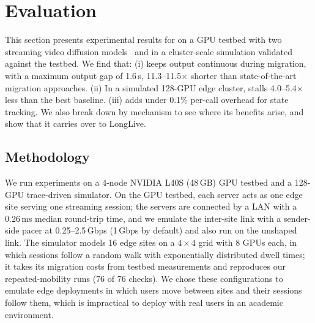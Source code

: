 
\section{Evaluation}
\label{sec:eval}

This section presents experimental results for \sys on a GPU testbed with two streaming video diffusion
models~\cite{sdv2,longlive} and in a cluster-scale simulation validated against the testbed.
We find that:
(i) \sys keeps output continuous during migration, with a maximum output gap of 1.6\,s, 11.3--11.5$\times$ shorter
than state-of-the-art migration approaches.
(ii) In a simulated 128-GPU edge cluster, \sys stalls 4.0--5.4$\times$ less than the best baseline.
(iii) \sys adds under 0.1\% per-call overhead for state tracking.
We also break down \sys by mechanism to see where its benefits arise, and show that it carries over to LongLive.

\subsection{Methodology}
\label{subsec:eval_method}

 We run experiments on a 4-node NVIDIA L40S (48\,GB) GPU testbed and a 128-GPU
trace-driven simulator. On the GPU testbed, each server acts as one edge site serving one streaming session; the
servers are connected by a LAN with a 0.26\,ms median round-trip time, and we emulate the inter-site link with a
sender-side pacer at 0.25--2.5\,Gbps (1\,Gbps by default) and also run on the unshaped link. The simulator models 16
edge sites on a $4\times4$ grid with 8 GPUs each, in which sessions follow a random walk with exponentially
distributed dwell times; it takes its migration costs from testbed measurements and reproduces our repeated-mobility
runs (76 of 76 checks). We chose these configurations to emulate edge deployments in which users move between sites
and their sessions follow them, which is impractical to deploy with real users in an academic environment.

